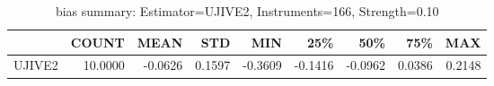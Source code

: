 \begin{table}[ht]
\centering
\caption{bias summary: Estimator=UJIVE2, Instruments=166, Strength=0.10}
\begin{tabular}{lrrrrrrrr}
\toprule
 & COUNT & MEAN & STD & MIN & 25\% & 50\% & 75\% & MAX \\
\midrule
UJIVE2 & 10.0000 & -0.0626 & 0.1597 & -0.3609 & -0.1416 & -0.0962 & 0.0386 & 0.2148 \\
\bottomrule
\end{tabular}
\end{table}
